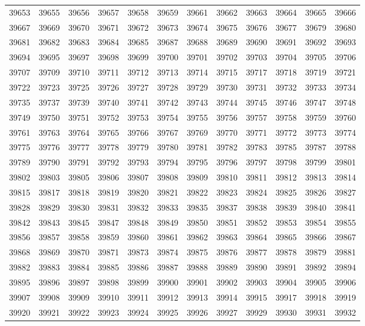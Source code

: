 \begin{center}
\begin{longtable}{llllllllllll}
39653 &39655 &39656 &39657 &39658 &39659 &39661 &39662 &39663 &39664 &39665 &39666 \\
39667 &39669 &39670 &39671 &39672 &39673 &39674 &39675 &39676 &39677 &39679 &39680 \\
39681 &39682 &39683 &39684 &39685 &39687 &39688 &39689 &39690 &39691 &39692 &39693 \\
39694 &39695 &39697 &39698 &39699 &39700 &39701 &39702 &39703 &39704 &39705 &39706 \\
39707 &39709 &39710 &39711 &39712 &39713 &39714 &39715 &39717 &39718 &39719 &39721 \\
39722 &39723 &39725 &39726 &39727 &39728 &39729 &39730 &39731 &39732 &39733 &39734 \\
39735 &39737 &39739 &39740 &39741 &39742 &39743 &39744 &39745 &39746 &39747 &39748 \\
39749 &39750 &39751 &39752 &39753 &39754 &39755 &39756 &39757 &39758 &39759 &39760 \\
39761 &39763 &39764 &39765 &39766 &39767 &39769 &39770 &39771 &39772 &39773 &39774 \\
39775 &39776 &39777 &39778 &39779 &39780 &39781 &39782 &39783 &39785 &39787 &39788 \\
39789 &39790 &39791 &39792 &39793 &39794 &39795 &39796 &39797 &39798 &39799 &39801 \\
39802 &39803 &39805 &39806 &39807 &39808 &39809 &39810 &39811 &39812 &39813 &39814 \\
39815 &39817 &39818 &39819 &39820 &39821 &39822 &39823 &39824 &39825 &39826 &39827 \\
39828 &39829 &39830 &39831 &39832 &39833 &39835 &39837 &39838 &39839 &39840 &39841 \\
39842 &39843 &39845 &39847 &39848 &39849 &39850 &39851 &39852 &39853 &39854 &39855 \\
39856 &39857 &39858 &39859 &39860 &39861 &39862 &39863 &39864 &39865 &39866 &39867 \\
39868 &39869 &39870 &39871 &39873 &39874 &39875 &39876 &39877 &39878 &39879 &39881 \\
39882 &39883 &39884 &39885 &39886 &39887 &39888 &39889 &39890 &39891 &39892 &39894 \\
39895 &39896 &39897 &39898 &39899 &39900 &39901 &39902 &39903 &39904 &39905 &39906 \\
39907 &39908 &39909 &39910 &39911 &39912 &39913 &39914 &39915 &39917 &39918 &39919 \\
39920 &39921 &39922 &39923 &39924 &39925 &39926 &39927 &39929 &39930 &39931 &39932 \\

\end{longtable}
\end{center}
